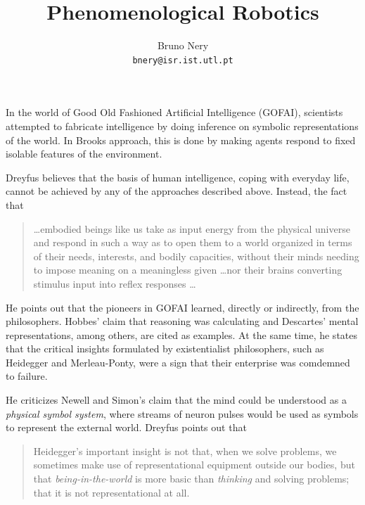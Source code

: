 \documentclass{article}
\title{Phenomenological Robotics}
\author{Bruno Nery\\
        \texttt{bnery@isr.ist.utl.pt}}
\begin{document}
\maketitle

In the world of Good Old Fashioned Artificial Intelligence (GOFAI), scientists
attempted to fabricate intelligence by doing inference on symbolic
representations of the world. In Brooks \cite{brooks91} approach, this is done
by making agents respond to fixed isolable features of the environment.

Dreyfus \cite{dreyfus07} believes that the basis of human intelligence, coping
with everyday life, cannot be achieved by any of the approaches described above.
Instead, the fact that

\begin{quotation}
  \dots embodied beings like us take as input energy from the physical universe
  and respond in such a way as to open them to a world organized in terms of
  their needs, interests, and bodily capacities, without their minds needing to
  impose meaning on a meaningless given \dots nor their brains converting
  stimulus input into reflex responses \dots
\end{quotation}


He points out that the pioneers in GOFAI learned, directly or indirectly, from
the philosophers. Hobbes' claim that reasoning was calculating and Descartes'
mental representations, among others, are cited as examples. At the same time,
he states that the critical insights formulated by existentialist philosophers,
such as Heidegger and Merleau-Ponty, were a sign that their enterprise was
comdemned to failure.

He criticizes Newell and Simon's claim that the mind could be understood as a
\emph{physical symbol system}, where streams of neuron pulses would be used as
symbols to represent the external world. Dreyfus points out that

\begin{quotation}
  Heidegger's important insight is not that, when we solve problems, we
  sometimes make use of representational equipment outside our bodies, but that
  \emph{being-in-the-world} is more basic than \emph{thinking} and solving
  problems; that it is not representational at all.
\end{quotation}
\end{document}
